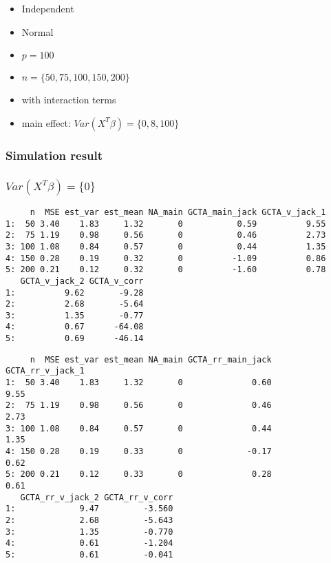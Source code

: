 \documentclass[]{article}
\providecommand{\tightlist}{%
  \setlength{\itemsep}{0pt}\setlength{\parskip}{0pt}}
\begin{document}
\begin{itemize}
\tightlist
\item
  Independent
\item
  Normal
\item
  \(p = 100\)
\item
  \(n = \{50, 75,100, 150, 200\}\)
\item
  with interaction terms
\item
  main effect: \(Var(X^T\beta) = \{0,8,100\}\) \newpage
\end{itemize}

\subsubsection{Simulation result}\label{simulation-result}

\subsubsection{\texorpdfstring{\(Var(X^T\beta) = \{0\}\)}{Var(X\^{}T\textbackslash{}beta) = \textbackslash{}\{0\textbackslash{}\}}}\label{varxtbeta-0}

\begin{verbatim}
     n  MSE est_var est_mean NA_main GCTA_main_jack GCTA_v_jack_1
1:  50 3.40    1.83     1.32       0           0.59          9.55
2:  75 1.19    0.98     0.56       0           0.46          2.73
3: 100 1.08    0.84     0.57       0           0.44          1.35
4: 150 0.28    0.19     0.32       0          -1.09          0.86
5: 200 0.21    0.12     0.32       0          -1.60          0.78
   GCTA_v_jack_2 GCTA_v_corr
1:          9.62       -9.28
2:          2.68       -5.64
3:          1.35       -0.77
4:          0.67      -64.08
5:          0.69      -46.14
\end{verbatim}

\begin{verbatim}
     n  MSE est_var est_mean NA_main GCTA_rr_main_jack GCTA_rr_v_jack_1
1:  50 3.40    1.83     1.32       0              0.60             9.55
2:  75 1.19    0.98     0.56       0              0.46             2.73
3: 100 1.08    0.84     0.57       0              0.44             1.35
4: 150 0.28    0.19     0.33       0             -0.17             0.62
5: 200 0.21    0.12     0.33       0              0.28             0.61
   GCTA_rr_v_jack_2 GCTA_rr_v_corr
1:             9.47         -3.560
2:             2.68         -5.643
3:             1.35         -0.770
4:             0.61         -1.204
5:             0.61         -0.041
\end{verbatim}
\end{document}
